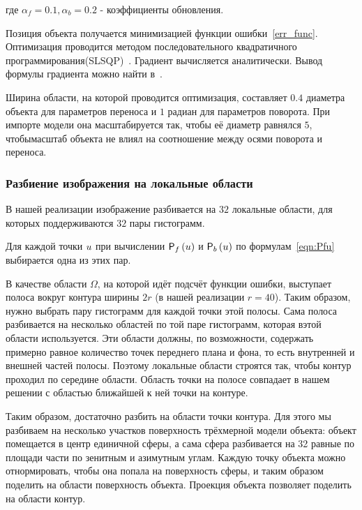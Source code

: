 где $\alpha_f = 0.1, \alpha_b = 0.2$ - коэффициенты обновления.

Позиция объекта получается минимизацией функции ошибки~\ref{err_func}.
Оптимизация проводится методом последовательного квадратичного
программирования(SLSQP)~\cite{SLSQP}.
Градиент вычисляется аналитически.
Вывод формулы градиента можно найти в~\cite{Tjaden2018}.

Ширина области, на которой проводится оптимизация, составляет $0.4$ диаметра
объекта для параметров переноса и $1$ радиан для параметров поворота.
При импорте модели она масштабируется так, чтобы её диаметр равнялся $5$,
чтобымасштаб объекта не влиял на соотношение между осями поворота и переноса.



\subsubsection*{Разбиение изображения на локальные области}

В нашей реализации изображение разбивается на $32$ локальные области, для
которых поддерживаются $32$ пары гистограмм.

Для каждой точки $\mathnormal{u}$ при вычислении $\mathsf{P}_f \left( \mathnormal{u} \right)$ и $\mathsf{P}_b \left( \mathnormal{u} \right)$ по
формулам~\ref{eqn:Pfu} выбирается одна из этих пар.

В качестве области $\Omega$, на которой идёт подсчёт функции ошибки, выступает
полоса вокруг контура ширины $2r$ (в нашей реализации $r = 40$).
Таким образом, нужно выбрать пару гистограмм для каждой точки этой полосы.
Сама полоса разбивается на несколько областей по той паре гистограмм, которая
вэтой области используется.
Эти области должны, по возможности, содержать примерно равное количество точек
переднего плана и фона, то есть внутренней и внешней частей полосы.
Поэтому локальные области строятся так, чтобы контур проходил по середине
области.
Область точки на полосе совпадает в нашем решении с областью ближайшей к ней
точки на контуре.

Таким образом, достаточно разбить на области точки контура.
Для этого мы разбиваем на несколько участков поверхность трёхмерной модели
объекта: объект помещается в центр единичной сферы, а сама сфера разбивается
на 32 равные по площади части по зенитным и азимутным углам.
Каждую точку объекта можно отнормировать, чтобы она попала на поверхность
сферы, и таким образом поделить на области поверхность объекта.
Проекция объекта позволяет поделить на области контур.

